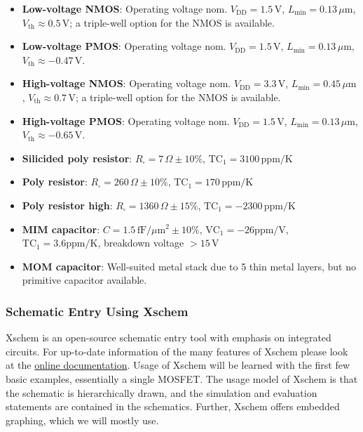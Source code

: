 \documentclass[
  letterpaper,
  DIV=11,
  numbers=noendperiod]{scrartcl}
\providecommand{\tightlist}{%
  \setlength{\itemsep}{0pt}\setlength{\parskip}{0pt}}\usepackage{longtable,booktabs,array}
\begin{document}
\begin{itemize}
\tightlist
\item
  \textbf{Low-voltage NMOS}: Operating voltage nom.
  \(V_\mathrm{DD}=1.5\,\text{V}\), \(L_\mathrm{min}=0.13\,\mu\text{m}\),
  \(V_\mathrm{th} \approx 0.5\,\text{V}\); a triple-well option for the
  NMOS is available.
\item
  \textbf{Low-voltage PMOS}: Operating voltage nom.
  \(V_\mathrm{DD}=1.5\,\text{V}\), \(L_\mathrm{min}=0.13\,\mu\text{m}\),
  \(V_\mathrm{th} \approx -0.47\,\text{V}\).
\item
  \textbf{High-voltage NMOS}: Operating voltage nom.
  \(V_\mathrm{DD}=3.3\,\text{V}\), \(L_\mathrm{min}=0.45\,\mu\text{m}\),
  \(V_\mathrm{th} \approx 0.7\,\text{V}\); a triple-well option for the
  NMOS is available.
\item
  \textbf{High-voltage PMOS}: Operating voltage nom.
  \(V_\mathrm{DD}=1.5\,\text{V}\), \(L_\mathrm{min}=0.13\,\mu\text{m}\),
  \(V_\mathrm{th} \approx -0.65\,\text{V}\).
\item
  \textbf{Silicided poly resistor}: \(R_\square=7\,\Omega \pm 10\%\),
  \(\mathrm{TC}_1=3100\,\text{ppm/K}\)
\item
  \textbf{Poly resistor}: \(R_\square=260\,\Omega \pm 10\%\),
  \(\mathrm{TC}_1=170\,\text{ppm/K}\)
\item
  \textbf{Poly resistor high}: \(R_\square=1360\,\Omega \pm 15\%\),
  \(\mathrm{TC}_1=-2300\,\text{ppm/K}\)
\item
  \textbf{MIM capacitor}: \(C=1.5\,\text{fF}/\mu\text{m}^2 \pm 10\%\),
  \(\mathrm{VC}_1=-26\text{ppm/V}\), \(\mathrm{TC}_1=3.6\text{ppm/K}\),
  breakdown voltage \(>15\,\mathrm{V}\)
\item
  \textbf{MOM capacitor}: Well-suited metal stack due to 5 thin metal
  layers, but no primitive capacitor available.
\end{itemize}

\subsubsection{Schematic Entry Using
Xschem}\label{schematic-entry-using-xschem}

Xschem is an open-source schematic entry tool with emphasis on
integrated circuits. For up-to-date information of the many features of
Xschem please look at the
\href{https://xschem.sourceforge.io/stefan/xschem_man/xschem_man.html}{online
documentation}. Usage of Xschem will be learned with the first few basic
examples, essentially a single MOSFET. The usage model of Xschem is that
the schematic is hierarchically drawn, and the simulation and evaluation
statements are contained in the schematics. Further, Xschem offers
embedded graphing, which we will mostly use.
\end{document}
